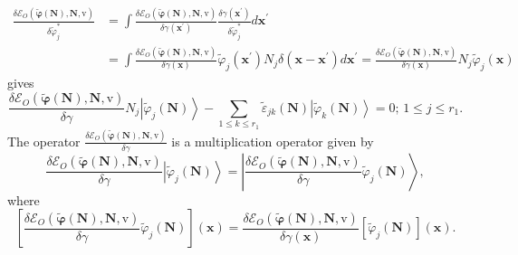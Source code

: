 \documentclass[aps,preprint]{revtex4}%
\begin{document}
\begin{align}
\frac{\delta\mathcal{E}_{O}\left(  \mathbf{\tilde{\varphi}}\left(
\mathbf{N}\right)  ,\mathbf{N,}\mathrm{v}\right)  }{\delta\tilde{\varphi}%
_{j}^{\ast}}  &  =\int\frac{\delta\mathcal{E}_{O}\left(  \mathbf{\tilde
{\varphi}}\left(  \mathbf{N}\right)  ,\mathbf{N,}\mathrm{v}\right)  }%
{\delta\gamma\left(  \mathbf{x}^{\prime}\right)  }\frac{\delta\gamma\left(
\mathbf{x}^{\prime}\right)  }{\delta\tilde{\varphi}_{j}^{\ast}}d\mathbf{x}%
^{\prime}\nonumber\\
&  =\int\frac{\delta\mathcal{E}_{O}\left(  \mathbf{\tilde{\varphi}}\left(
\mathbf{N}\right)  ,\mathbf{N,}\mathrm{v}\right)  }{\delta\gamma\left(
\mathbf{x}\right)  }\tilde{\varphi}_{j}\left(  \mathbf{x}^{\prime}\right)
N_{j}\delta\left(  \mathbf{x-x}^{\prime}\right)  d\mathbf{x}^{\prime}%
=\frac{\delta\mathcal{E}_{O}\left(  \mathbf{\tilde{\varphi}}\left(
\mathbf{N}\right)  ,\mathbf{N,}\mathrm{v}\right)  }{\delta\gamma\left(
\mathbf{x}\right)  }N_{j}\tilde{\varphi}_{j}\left(  \mathbf{x}\right)
\end{align}
gives%
\begin{equation}
\frac{\delta\mathcal{E}_{O}\left(  \mathbf{\tilde{\varphi}}\left(
\mathbf{N}\right)  ,\mathbf{N,}\mathrm{v}\right)  }{\delta\gamma}%
N_{j}\left\vert \tilde{\varphi}_{j}\left(  \mathbf{N}\right)  \right\rangle
-\sum_{1\leq k\leq r_{1}}\tilde{\varepsilon}_{jk}\left(  \mathbf{N}\right)
\left\vert \tilde{\varphi}_{k}\left(  \mathbf{N}\right)  \right\rangle
=0;\,1\leq j\leq r_{1}.
\end{equation}
The operator $\frac{\delta\mathcal{E}_{O}\left(  \mathbf{\tilde{\varphi}%
}\left(  \mathbf{N}\right)  ,\mathbf{N,}\mathrm{v}\right)  }{\delta\gamma}$ is
a multiplication operator given by
\begin{equation}
\frac{\delta\mathcal{E}_{O}\left(  \mathbf{\tilde{\varphi}}\left(
\mathbf{N}\right)  ,\mathbf{N,}\mathrm{v}\right)  }{\delta\gamma}\left\vert
\tilde{\varphi}_{j}\left(  \mathbf{N}\right)  \right\rangle =\left\vert
\frac{\delta\mathcal{E}_{O}\left(  \mathbf{\tilde{\varphi}}\left(
\mathbf{N}\right)  ,\mathbf{N,}\mathrm{v}\right)  }{\delta\gamma}%
\tilde{\varphi}_{j}\left(  \mathbf{N}\right)  \right\rangle ,
\end{equation}
where
\begin{equation}
\left[  \frac{\delta\mathcal{E}_{O}\left(  \mathbf{\tilde{\varphi}}\left(
\mathbf{N}\right)  ,\mathbf{N,}\mathrm{v}\right)  }{\delta\gamma}%
\tilde{\varphi}_{j}\left(  \mathbf{N}\right)  \right]  \left(  \mathbf{x}%
\right)  =\frac{\delta\mathcal{E}_{O}\left(  \mathbf{\tilde{\varphi}}\left(
\mathbf{N}\right)  ,\mathbf{N,}\mathrm{v}\right)  }{\delta\gamma\left(
\mathbf{x}\right)  }\left[  \tilde{\varphi}_{j}\left(  \mathbf{N}\right)
\right]  \left(  \mathbf{x}\right)  .
\end{equation}
\end{document}
